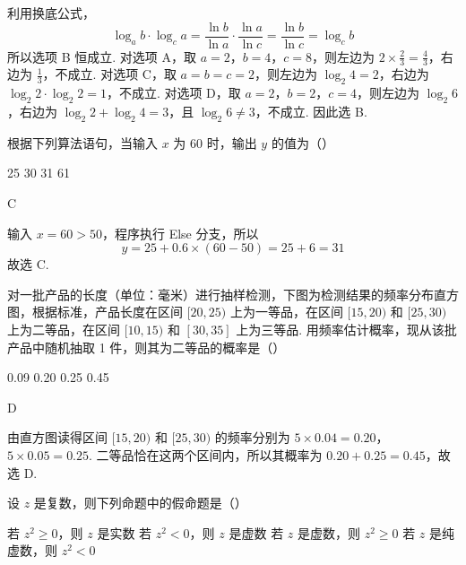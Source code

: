 \begin{solution}
利用换底公式，
\[
\log_a b\cdot\log_c a=\frac{\ln b}{\ln a}\cdot\frac{\ln a}{\ln c}=\frac{\ln b}{\ln c}=\log_c b
\]
所以选项 B 恒成立. 对选项 A，取 \(a=2\)，\(b=4\)，\(c=8\)，则左边为 \(2\times\frac23=\frac43\)，右边为 \(\frac13\)，不成立. 对选项 C，取 \(a=b=c=2\)，则左边为 \(\log_2 4=2\)，右边为 \(\log_2 2\cdot\log_2 2=1\)，不成立. 对选项 D，取 \(a=2\)，\(b=2\)，\(c=4\)，则左边为 \(\log_2 6\)，右边为 \(\log_2 2+\log_2 4=3\)，且 \(\log_2 6\ne3\)，不成立. 因此选 B.
\end{solution}

\begin{problem}
根据下列算法语句，当输入 \(x\) 为 60 时，输出 \(y\) 的值为（\quad）


\choices
    {25}
    {30}
    {31}
    {61}
\end{problem}

\begin{answer}
C
\end{answer}

\begin{solution}
输入 \(x=60>50\)，程序执行 Else 分支，所以
\[
y=25+0.6\times(60-50)=25+6=31
\]
故选 C.
\end{solution}

\begin{problem}
对一批产品的长度（单位：毫米）进行抽样检测，下图为检测结果的频率分布直方图，根据标准，产品长度在区间 \([20, 25)\) 上为一等品，在区间 \([15, 20)\) 和 \([25, 30)\) 上为二等品，在区间 \([10, 15)\) 和 \([30, 35]\) 上为三等品. 用频率估计概率，现从该批产品中随机抽取 1 件，则其为二等品的概率是（\quad）


\choices
    {0.09}
    {0.20}
    {0.25}
    {0.45}
\end{problem}

\begin{answer}
D
\end{answer}

\begin{solution}
由直方图读得区间 \([15,20)\) 和 \([25,30)\) 的频率分别为
\(5\times0.04=0.20\)，\(5\times0.05=0.25\).
二等品恰在这两个区间内，所以其概率为 \(0.20+0.25=0.45\)，故选 D.
\end{solution}

\begin{problem}
设 \(z\) 是复数，则下列命题中的假命题是（\quad）

\choices
    {若 \( z^{2} \geqslant 0 \)，则 \(z\) 是实数}
    {若 \(z^2 < 0\)，则 \(z\) 是虚数}
    {若 \(z\) 是虚数，则 \(z^2 \geqslant 0\)}
    {若 \(z\) 是纯虚数，则 \(z^2 < 0\)}
\end{problem}

